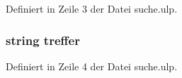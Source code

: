 Definiert in Zeile 3 der Datei suche.\+ulp.

\hypertarget{suche_8ulp_a69c65182de5042fc6e8abefd0d0e175e}{}
\subsubsection[{treffer}]{\setlength{\rightskip}{0pt plus 5cm}string treffer}\label{suche_8ulp_a69c65182de5042fc6e8abefd0d0e175e}


Definiert in Zeile 4 der Datei suche.\+ulp.

